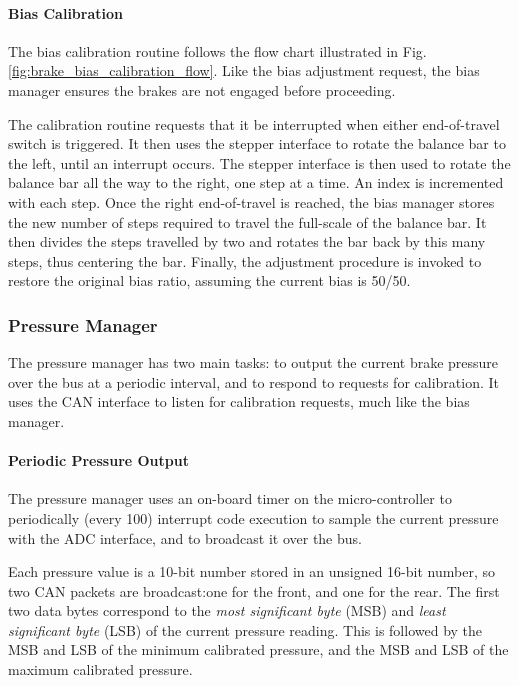 \paragraph{Bias Calibration}

The bias calibration routine follows the flow chart illustrated in Fig. \ref{fig:brake_bias_calibration_flow}. Like the bias adjustment request, the bias manager ensures the brakes are not engaged before proceeding.

The calibration routine requests that it be interrupted when either end-of-travel switch is triggered. It then uses the stepper interface to rotate the balance bar to the left, until an interrupt occurs. The stepper interface is then used to rotate the balance bar all the way to the right, one step at a time. An index is incremented with each step. Once the right end-of-travel is reached, the bias manager stores the new number of steps required to travel the full-scale of the balance bar. It then divides the steps travelled by two and rotates the bar back by this many steps, thus centering the bar. Finally, the adjustment procedure is invoked to restore the original bias ratio, assuming the current bias is 50/50.

\subsubsection{Pressure Manager}

The pressure manager has two main tasks: to output the current brake pressure over the bus at a periodic interval, and to respond to requests for calibration. It uses the CAN interface to listen for calibration requests, much like the bias manager. 

\paragraph{Periodic Pressure Output}

The pressure manager uses an on-board timer on the micro-controller to periodically (every \unit{100}{\milli\second}) interrupt code execution to sample the current pressure with the ADC interface, and to broadcast it over the bus. 

Each pressure value is a 10-bit number stored in an unsigned 16-bit number, so two CAN packets are broadcast:one for the front, and one for the rear. The first two data bytes correspond to the \emph{most significant byte} (MSB) and \emph{least significant byte} (LSB) of the current pressure reading. This is followed by the MSB and LSB of the minimum calibrated pressure, and the MSB and LSB of the maximum calibrated pressure.

